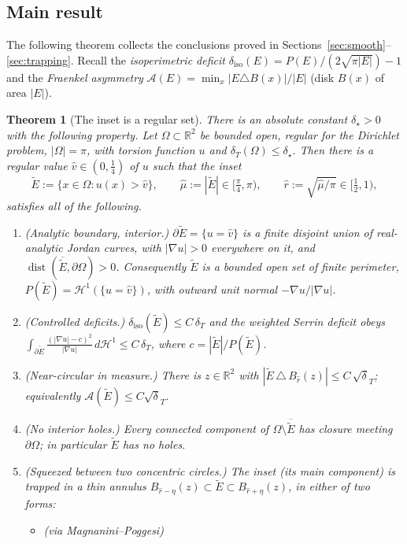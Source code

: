 \documentclass[11pt]{article}
\newtheorem{theorem}{Theorem}[section]
\theoremstyle{definition}
\newcommand{\R}{\mathbb{R}}
\newcommand{\Om}{\Omega}
\newcommand{\HH}{\mathcal{H}}
\newcommand{\dT}{\delta_T}
\newcommand{\diso}{\delta_{\mathrm{iso}}}
\newcommand{\Etil}{\widetilde E}
\newcommand{\abs}[1]{\left|#1\right|}
\begin{document}
\subsection*{Main result}
The following theorem collects the conclusions proved in
Sections~\ref{sec:smooth}--\ref{sec:trapping}. Recall the \emph{isoperimetric
deficit} $\diso(E)=P(E)/(2\sqrt{\pi|E|})-1$ and the \emph{Fraenkel
asymmetry} $\mathcal A(E)=\min_x|E\triangle B(x)|/|E|$ (disk $B(x)$ of area
$|E|$).

\begin{theorem}[The inset is a regular set]\label{thm:main}
There is an absolute constant $\delta_\star>0$ with the following property.
Let $\Om\subset\R^2$ be bounded open, regular for the Dirichlet problem,
$|\Om|=\pi$, with torsion function $u$ and $\dT(\Om)\le\delta_\star$. Then
there is a regular value $\hat v\in(0,\tfrac14)$ of $u$ such that the
\emph{inset}
\[
   \Etil:=\{x\in\Om:u(x)>\hat v\},\qquad
   \hat\mu:=|\Etil|\in[\tfrac\pi4,\pi),\qquad
   \hat r:=\sqrt{\hat\mu/\pi}\in[\tfrac12,1),
\]
satisfies all of the following.
\begin{enumerate}[label=\textup{(\roman*)},leftmargin=2.4em]
\item \textup{(Analytic boundary, interior.)} $\partial\Etil=\{u=\hat v\}$
is a finite disjoint union of real-analytic Jordan curves, with
$|\nabla u|>0$ everywhere on it, and
$\operatorname{dist}(\overline\Etil,\partial\Om)>0$. Consequently $\Etil$ is
a bounded open set of finite perimeter, $P(\Etil)=\HH^1(\{u=\hat v\})$, with
outward unit normal $-\nabla u/|\nabla u|$.
\item \textup{(Controlled deficits.)} $\diso(\Etil)\le C\,\dT$ and the
weighted Serrin deficit obeys
$\displaystyle\int_{\partial\Etil}\frac{(|\nabla u|-c)^2}{|\nabla u|}\,
d\HH^1\le C\,\dT$, where $c=|\Etil|/P(\Etil)$.
\item \textup{(Near-circular in measure.)} There is $z\in\R^2$ with
$\abs{\Etil\,\triangle\,B_{\hat r}(z)}\le C\,\sqrt\dT$; equivalently
$\mathcal A(\Etil)\le C\sqrt\dT$.
\item \textup{(No interior holes.)} Every connected component of
$\Om\setminus\overline\Etil$ has closure meeting $\partial\Om$; in
particular $\Etil$ has no holes.
\item \textup{(Squeezed between two concentric circles.)} The inset (its
main component) is trapped in a thin annulus
$B_{\hat r-\eta}(z)\subset\Etil\subset B_{\hat r+\eta}(z)$, in either of two
forms:
\begin{itemize}[leftmargin=1.4em]
\item[\textup{(v$_{\mathrm{a}}$)}] \textup{(via Magnanini--Poggesi)}

\end{itemize}
\end{enumerate}
\end{theorem}
\end{document}
